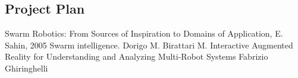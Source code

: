 \documentclass[titlepage,hidelinks,10pt]{article}
\begin{document}
\begin{multicols*}{2}
\section{Project Plan}
\begin{thebibliography}{1}
 Swarm Robotics: From Sources of
Inspiration to Domains of Application, E. Sahin, 2005
 Swarm intelligence. Dorigo M. Birattari M.
 Interactive Augmented Reality for Understanding and Analyzing Multi-Robot Systems Fabrizio Ghiringhelli
\end{thebibliography}

\end{multicols*}
\end{document}
